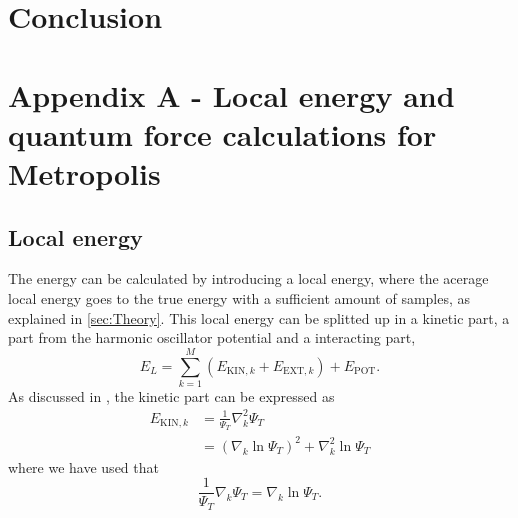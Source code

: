 \documentclass[norsk,a4paper,12pt]{article}
\begin{document}
\section{Conclusion} \label{sec:Conclusion}

\newpage

\section{Appendix A - Local energy and quantum force calculations for Metropolis} \label{sec:appendix_A}

\subsection{Local energy}

The energy can be calculated by introducing a local energy, where the acerage local energy goes to the true energy with a sufficient amount of samples, as explained in \ref{sec:Theory}. This local energy can be splitted up in a kinetic part, a part from the harmonic oscillator potential and a interacting part,
\begin{equation}
E_L=\sum_{k=1}^{M}(E_{\text{KIN},k} + E_{\text{EXT},k})+E_{\text{POT}}.
\end{equation}
As discussed in \cite{Nordhagen}, the kinetic part can be expressed as
\begin{align}
E_{\text{KIN},k}&=\frac{1}{\Psi_T}\nabla_k^2\Psi_T\\
&=(\nabla_k\ln\Psi_T)^2+\nabla_k^2\ln\Psi_T
\end{align}
where we have used that
\begin{equation}
\frac{1}{\Psi_T}\nabla_k\Psi_T=\nabla_k\ln\Psi_T.
\end{equation}
\end{document}
